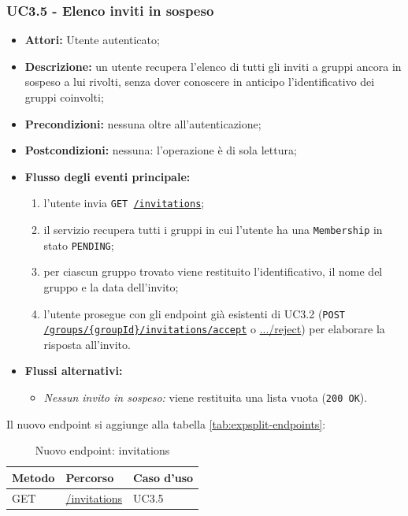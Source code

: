 \subsubsection{UC3.5 - Elenco inviti in sospeso}
\begin{itemize}
    \item \textbf{Attori:} Utente autenticato;
    \item \textbf{Descrizione:} un utente recupera l'elenco di tutti gli inviti a gruppi ancora in sospeso a lui rivolti, senza dover conoscere in anticipo l'identificativo dei gruppi coinvolti;
    \item \textbf{Precondizioni:} nessuna oltre all'autenticazione;
    \item \textbf{Postcondizioni:} nessuna: l'operazione è di sola lettura;
    \item \textbf{Flusso degli eventi principale:}
    \begin{enumerate}
        \item l'utente invia \texttt{GET \url{/invitations}};
        \item il servizio recupera tutti i gruppi in cui l'utente ha una \texttt{Membership} in stato \texttt{PENDING};
        \item per ciascun gruppo trovato viene restituito l'identificativo, il nome del gruppo e la data dell'invito;
        \item l'utente prosegue con gli endpoint già esistenti di UC3.2 (\texttt{POST \url{/groups/{groupId}/invitations/accept}} o \url{.../reject}) per elaborare la risposta all'invito.
    \end{enumerate}
    \item \textbf{Flussi alternativi:}
    \begin{itemize}
        \item \emph{Nessun invito in sospeso:} viene restituita una lista vuota (\texttt{200 OK}).
    \end{itemize}
\end{itemize}

Il nuovo endpoint si aggiunge alla tabella \ref{tab:expsplit-endpoints}:

\begin{table}[H]
    \centering
    \begin{tabular}{lll}
        \hline
        \textbf{Metodo} & \textbf{Percorso} & \textbf{Caso d'uso} \\
        \hline
        GET & \url{/invitations} & UC3.5 \\
        \hline
    \end{tabular}
    \caption{Nuovo endpoint: invitations}
    \label{tab:expsplit-endpoints-it3}
\end{table}

